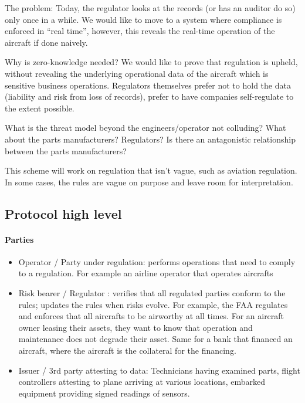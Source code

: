 The problem: Today, the regulator looks at the records (or has an auditor do so) only once in a while. We would like to move to a system where compliance is enforced in ``real time'', however, this reveals the real-time operation of the aircraft if done naively.

Why is zero-knowledge needed? We would like to prove that regulation is upheld, without revealing the underlying operational data of the aircraft which is sensitive business operations. 
Regulators themselves prefer not to hold the data (liability and risk from loss of records), prefer to have companies self-regulate to the extent possible. 

What is the threat model beyond the engineers/operator not colluding?  What about the parts manufacturers?  Regulators?  Is there an antagonistic relationship between the parts manufacturers?

This scheme will work on regulation that isn't vague, such as aviation regulation. In some cases, the rules are vague on purpose and leave room for interpretation.


\subsection{Protocol high level}
\label{apps:regulation-compliance:protocol-high-level}


\paragraph[:]{Parties} 
\begin{itemize}
    \item Operator / Party under regulation: performs operations that need to comply to a regulation. For example an airline operator that operates aircrafts
    \item Risk bearer / Regulator : verifies that all regulated parties conform to the rules; updates the rules when risks evolve. For example, the FAA regulates and enforces that all aircrafts to be airworthy at all times. For an aircraft owner leasing their assets, they want to know that operation and maintenance does not degrade their asset. Same for a bank that financed an aircraft, where the aircraft is the collateral for the financing.  
    \item Issuer / 3rd party attesting to data: Technicians having examined parts, flight controllers attesting to plane arriving at various locations, embarked equipment providing signed readings of sensors.
\end{itemize}


